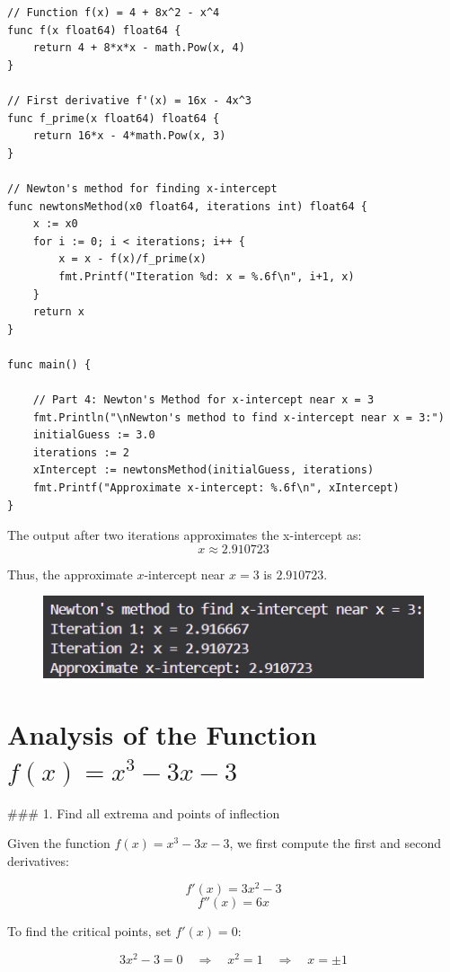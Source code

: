 \documentclass[11pt]{article}
\begin{document}
\begin{verbatim}
// Function f(x) = 4 + 8x^2 - x^4
func f(x float64) float64 {
    return 4 + 8*x*x - math.Pow(x, 4)
}

// First derivative f'(x) = 16x - 4x^3
func f_prime(x float64) float64 {
    return 16*x - 4*math.Pow(x, 3)
}

// Newton's method for finding x-intercept
func newtonsMethod(x0 float64, iterations int) float64 {
    x := x0
    for i := 0; i < iterations; i++ {
        x = x - f(x)/f_prime(x)
        fmt.Printf("Iteration %d: x = %.6f\n", i+1, x)
    }
    return x
}

func main() {

    // Part 4: Newton's Method for x-intercept near x = 3
    fmt.Println("\nNewton's method to find x-intercept near x = 3:")
    initialGuess := 3.0
    iterations := 2
    xIntercept := newtonsMethod(initialGuess, iterations)
    fmt.Printf("Approximate x-intercept: %.6f\n", xIntercept)
}
\end{verbatim}

The output after two iterations approximates the x-intercept as:
\[
x \approx 2.910723
\]

Thus, the approximate \( x \)-intercept near \( x = 3 \) is \( 2.910723 \).

\begin{figure}[!ht]
    \centering
    \includegraphics[width= 1 \textwidth]{images/x_1.png}
    \label{fig:1}
  \end{figure}
  \FloatBarrier

\section{Analysis of the Function \( f(x) = x^3 - 3x - 3 \)}

### 1. Find all extrema and points of inflection

Given the function \( f(x) = x^3 - 3x - 3 \), we first compute the first and second derivatives:

\[
f'(x) = 3x^2 - 3
\]
\[
f''(x) = 6x
\]

To find the critical points, set \( f'(x) = 0 \):

\[
3x^2 - 3 = 0 \quad \Rightarrow \quad x^2 = 1 \quad \Rightarrow \quad x = \pm 1
\]
\end{document}
